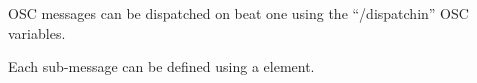 

OSC messages can be dispatched on beat one using the ``/dispatchin'' OSC variables.



Each sub-message can be defined using a  element.


